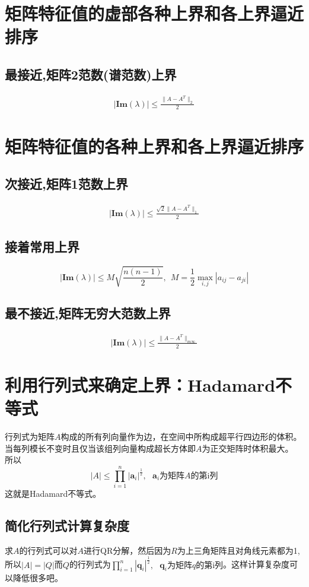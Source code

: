 \documentclass[12pt]{article}
\begin{document}
\begin{CJK*}{UTF8}{gbsn}
\section{矩阵特征值的虚部各种上界和各上界逼近排序}
\subsection{最接近,矩阵2范数(谱范数)上界}
\begin{align}
	|\textbf{Im}(\lambda)|\leq\frac{\|A-A^T\|_2}{2}
\end{align}
\section{矩阵特征值的各种上界和各上界逼近排序}
\subsection{次接近,矩阵1范数上界}
\begin{align}
	|\textbf{Im}(\lambda)|\leq\frac{\sqrt{2}\|A-A^T\|_1}{2}
\end{align}
\subsection{接着常用上界}
\begin{equation}
	|\textbf{Im}(\lambda)|\leq M\sqrt{\frac{n(n-1)}{2}},~~M=\frac{1}{2}\mathop{max}_{i,j}|a_{ij}-a_{ji}|\end{equation}
\subsection{最不接近,矩阵无穷大范数上界}
\begin{align}
	|\textbf{Im}(\lambda)|\leq\frac{\|A-A^T\|_{m\infty}}{2}
\end{align}
\section{利用行列式来确定上界：Hadamard不等式}
行列式为矩阵$A$构成的所有列向量作为边，在空间中所构成超平行四边形的体积。\\
当每列模长不变时且仅当该组列向量构成超长方体即$A$为正交矩阵时体积最大。\\
所以\begin{equation}
	|A|\leq \prod_{i=1}^{n}|\bm a_i|^{\frac{1}{2}},~~~\bm a_i\mbox{为矩阵$A$的第i列}
\end{equation}
这就是Hadamard不等式。
\subsection{简化行列式计算复杂度}
求$A$的行列式可以对$A$进行QR分解，然后因为$R$为上三角矩阵且对角线元素都为1,所以$|A|=|Q|$而$Q$的行列式为$\prod_{i=1}^{n}|\bm q_i|^{\frac{1}{2}},~~~\bm q_i\mbox{为矩阵$q$的第i列}$。这样计算复杂度可以降低很多吧。

\end{CJK*}
\end{document}
